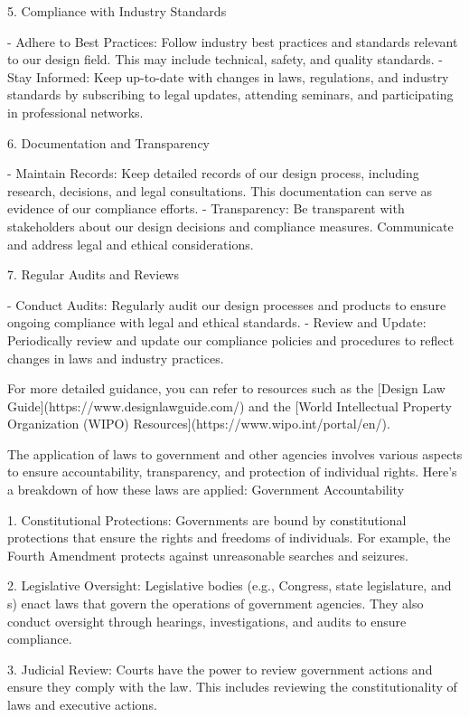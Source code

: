 \documentclass[12pt,letterpaper]{article}
\begin{document}
 5. Compliance with Industry Standards

- Adhere to Best Practices: Follow industry best practices and standards relevant to our design field. This may include technical, safety, and quality standards.
- Stay Informed: Keep up-to-date with changes in laws, regulations, and industry standards by subscribing to legal updates, attending seminars, and participating in professional networks.

 6. Documentation and Transparency

- Maintain Records: Keep detailed records of our design process, including research, decisions, and legal consultations. This documentation can serve as evidence of our compliance efforts.
- Transparency: Be transparent with stakeholders about our design decisions and compliance measures. Communicate and address legal and ethical considerations.

 7. Regular Audits and Reviews

- Conduct Audits: Regularly audit our design processes and products to ensure ongoing compliance with legal and ethical standards.
- Review and Update: Periodically review and update our compliance policies and procedures to reflect changes in laws and industry practices.

For more detailed guidance, you can refer to resources such as the [Design Law Guide](https://www.designlawguide.com/) and the [World Intellectual Property Organization (WIPO) Resources](https://www.wipo.int/portal/en/).


	
	
	
The application of laws to government and other agencies involves various aspects to ensure accountability, transparency, and protection of individual rights. Here’s a breakdown of how these laws are applied:
 Government Accountability

1. Constitutional Protections: Governments are bound by constitutional protections that ensure the rights and freedoms of individuals. For example, the Fourth Amendment protects against unreasonable searches and seizures.

2. Legislative Oversight: Legislative bodies (e.g., Congress, state legislature, and s) enact laws that govern the operations of government agencies. They also conduct oversight through hearings, investigations, and audits to ensure compliance.

3. Judicial Review: Courts have the power to review government actions and ensure they comply with the law. This includes reviewing the constitutionality of laws and executive actions.
\end{document}
